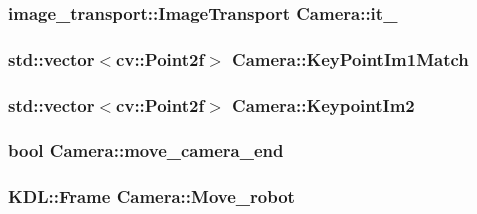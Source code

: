 \hypertarget{classCamera_aa96bda66d1fd41b525da47f086ea5a89}{
\subsubsection[{it\-\_\-}]{\setlength{\rightskip}{0pt plus 5cm}image\-\_\-transport\-::\-Image\-Transport Camera\-::it\-\_\-}}\label{classCamera_aa96bda66d1fd41b525da47f086ea5a89}
\hypertarget{classCamera_afb480f1314f4746356faf0c37907c20e}{
\subsubsection[{Key\-Point\-Im1\-Match}]{\setlength{\rightskip}{0pt plus 5cm}std\-::vector$<$cv\-::\-Point2f$>$ Camera\-::\-Key\-Point\-Im1\-Match}}\label{classCamera_afb480f1314f4746356faf0c37907c20e}
\hypertarget{classCamera_ab4604f1bddb77d7c8a1000e2f7e460b3}{
\subsubsection[{Keypoint\-Im2}]{\setlength{\rightskip}{0pt plus 5cm}std\-::vector$<$cv\-::\-Point2f$>$ Camera\-::\-Keypoint\-Im2}}\label{classCamera_ab4604f1bddb77d7c8a1000e2f7e460b3}
\hypertarget{classCamera_a5e294d376163c3c4be7bd7154c03220e}{
\subsubsection[{move\-\_\-camera\-\_\-end}]{\setlength{\rightskip}{0pt plus 5cm}bool Camera\-::move\-\_\-camera\-\_\-end}}\label{classCamera_a5e294d376163c3c4be7bd7154c03220e}
\hypertarget{classCamera_aabba2a74f24c615abb26ee433fb09b43}{
\subsubsection[{Move\-\_\-robot}]{\setlength{\rightskip}{0pt plus 5cm}K\-D\-L\-::\-Frame Camera\-::\-Move\-\_\-robot}}\label{classCamera_aabba2a74f24c615abb26ee433fb09b43}
